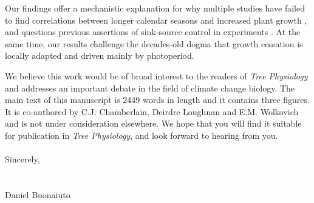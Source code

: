 \documentclass{article}[12pt]
\begin{document}
\noindent Our findings offer a mechanistic explanation for why multiple studies have failed to find correlations between longer calendar seasons and increased plant growth \citep{dow2022warm,silvestro2023longer}, and questions previous assertions of sink-source control in experiments \citep{Zani2020,norby2021comment,Zohner2023}. At the same time, our results challenge the decades-old dogma that growth cessation is locally adapted and driven mainly by photoperiod. 

\noindent We believe this work would be of broad interest to the readers of \textit{Tree Physiology} and addresses an important debate in the field of climate change biology. %
The main text of this manuscript is 2449 words in length and it contains three figures. It is co-authored by C.J. Chamberlain, Deirdre Loughnan and E.M. Wolkovich and is not under consideration elsewhere. We hope that you will find it suitable for publication in \textit{Tree Physiology}, and look forward to hearing from you.\\\
\\Sincerely,\\\\\\

\noindent Daniel Buonaiuto\\



\end{document}
